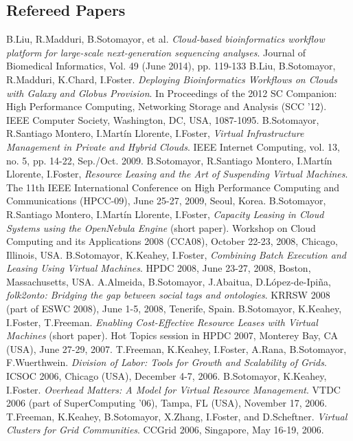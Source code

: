 \documentclass{resume}
\begin{document}
\subsection*{Refereed Papers}
\begin{category}{}
\citembullet B.Liu, R.Madduri, B.Sotomayor, et al. \emph{Cloud-based bioinformatics workflow platform for large-scale next-generation sequencing analyses}. Journal of Biomedical Informatics, Vol. 49 (June 2014), pp. 119-133
\citembullet B.Liu, B.Sotomayor, R.Madduri, K.Chard, I.Foster. \emph{Deploying Bioinformatics Workflows on Clouds with Galaxy and Globus Provision}. In Proceedings of the 2012 SC Companion: High Performance Computing, Networking Storage and Analysis (SCC '12). IEEE Computer Society, Washington, DC, USA, 1087-1095.
\citembullet B.Sotomayor, R.Santiago Montero, I.Martín Llorente, I.Foster, \emph{Virtual Infrastructure Management in Private and Hybrid Clouds}. IEEE Internet Computing, vol. 13, no. 5, pp. 14-22, Sep./Oct. 2009.
\citembullet B.Sotomayor, R.Santiago Montero, I.Martín Llorente, I.Foster, \emph{Resource Leasing and the Art of Suspending Virtual Machines}. The 11th IEEE International Conference on High Performance Computing and Communications (HPCC-09), June 25-27, 2009, Seoul, Korea.
\citembullet B.Sotomayor, R.Santiago Montero, I.Martín Llorente, I.Foster, \emph{Capacity Leasing in Cloud Systems using the OpenNebula Engine} (short paper). Workshop on Cloud Computing and its Applications 2008 (CCA08), October 22-23, 2008, Chicago, Illinois, USA.
\citembullet B.Sotomayor, K.Keahey, I.Foster, \emph{Combining Batch Execution and Leasing Using Virtual Machines}. HPDC 2008, June 23-27, 2008, Boston, Massachusetts, USA.
\citembullet A.Almeida, B.Sotomayor, J.Abaitua, D.López-de-Ipiña, \emph{folk2onto: Bridging the gap between social tags and ontologies}. KRRSW 2008 (part of ESWC 2008), June 1-5, 2008, Tenerife, Spain. 
\citembullet B.Sotomayor, K.Keahey, I.Foster, T.Freeman. \emph{Enabling Cost-Effective Resource Leases with Virtual Machines} (short paper). Hot Topics session in HPDC 2007, Monterey Bay, CA (USA), June 27-29, 2007.
\citembullet T.Freeman, K.Keahey, I.Foster, A.Rana, B.Sotomayor, F.Wuerthwein. \emph{Division of Labor: Tools for Growth and Scalability of Grids}. ICSOC 2006, Chicago (USA), December 4-7, 2006.
\citembullet B.Sotomayor, K.Keahey, I.Foster. \emph{Overhead Matters: A Model for Virtual Resource Management}. VTDC 2006 (part of SuperComputing '06), Tampa, FL (USA), November 17, 2006. 
\citembullet T.Freeman, K.Keahey, B.Sotomayor, X.Zhang, I.Foster, and D.Scheftner. \emph{Virtual Clusters for Grid Communities}. CCGrid 2006, Singapore, May 16-19, 2006.

\end{category}
\end{document}
